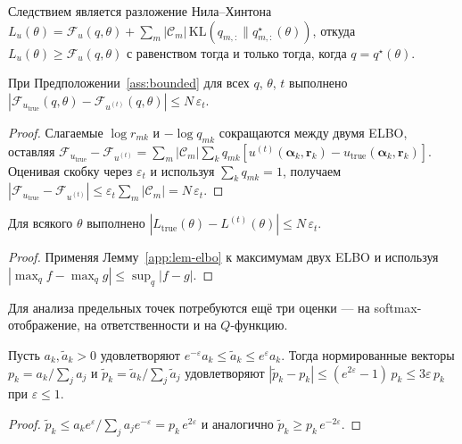 Следствием является разложение Нила--Хинтона
$L_u(\theta) = \mathcal{F}_u(q, \theta) + \sum_m |\mathcal{C}_m|\,
\mathrm{KL}(q_{m,:}\|q^{\star}_{m,:}(\theta))$, откуда
$L_u(\theta) \geq \mathcal{F}_u(q,\theta)$ с равенством тогда и только
тогда, когда $q = q^{\star}(\theta)$.

\begin{lemma}
\label{app:lem-elbo}
При Предположении~\ref{ass:bounded} для всех $q$, $\theta$, $t$
выполнено
$|\mathcal{F}_{u_{\mathrm{true}}}(q,\theta) - \mathcal{F}_{u^{(t)}}(q,\theta)|
\leq N\,\varepsilon_t$.
\end{lemma}

\begin{proof}
Слагаемые $\log r_{mk}$ и $-\log q_{mk}$ сокращаются между двумя
ELBO, оставляя
$\mathcal{F}_{u_{\mathrm{true}}} - \mathcal{F}_{u^{(t)}}
= \sum_m |\mathcal{C}_m| \sum_k q_{mk}
[u^{(t)}(\boldsymbol{\alpha}_k, \mathbf{r}_k) - u_{\mathrm{true}}(\boldsymbol{\alpha}_k, \mathbf{r}_k)]$.
Оценивая скобку через $\varepsilon_t$ и используя $\sum_k q_{mk} = 1$,
получаем
$|\mathcal{F}_{u_{\mathrm{true}}} - \mathcal{F}_{u^{(t)}}|
\leq \varepsilon_t \sum_m |\mathcal{C}_m| = N\,\varepsilon_t$.
\end{proof}

\begin{corollary}
\label{app:cor-lik}
Для всякого $\theta$ выполнено
$|L_{\mathrm{true}}(\theta) - L^{(t)}(\theta)| \leq N\,\varepsilon_t$.
\end{corollary}

\begin{proof}
Применяя Лемму~\ref{app:lem-elbo} к максимумам двух ELBO и используя
$|\max_q f - \max_q g| \leq \sup_q |f - g|$.
\end{proof}

Для анализа предельных точек потребуются ещё три оценки --- на
softmax-отображение, на ответственности и на $Q$-функцию.

\begin{lemma}
\label{app:lem-softmax}
Пусть $a_k, \tilde a_k > 0$ удовлетворяют
$e^{-\varepsilon} a_k \leq \tilde a_k \leq e^{\varepsilon} a_k$. Тогда
нормированные векторы $p_k = a_k/\sum_j a_j$ и
$\tilde p_k = \tilde a_k/\sum_j \tilde a_j$ удовлетворяют
$|\tilde p_k - p_k| \leq (e^{2\varepsilon} - 1)\,p_k \leq 3\varepsilon\,p_k$
при $\varepsilon \leq 1$.
\end{lemma}

\begin{proof}
$\tilde p_k \leq a_k e^{\varepsilon}/\sum_j a_j e^{-\varepsilon}
= p_k\,e^{2\varepsilon}$ и аналогично
$\tilde p_k \geq p_k\,e^{-2\varepsilon}$.
\end{proof}

